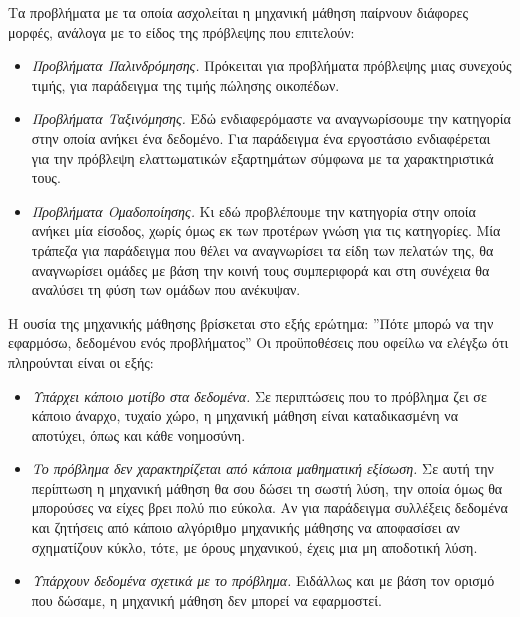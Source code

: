 \documentclass{article}
\begin{document}
Τα προβλήματα με τα οποία ασχολείται η μηχανική μάθηση παίρνουν διάφορες μορφές, ανάλογα με το είδος της πρόβλεψης που επιτελούν:
\begin{itemize}
\item \textit{Προβλήματα Παλινδρόμησης.} Πρόκειται για προβλήματα πρόβλεψης μιας συνεχούς τιμής, για παράδειγμα της τιμής πώλησης οικοπέδων.
\item \textit{Προβλήματα Ταξινόμησης.} Εδώ ενδιαφερόμαστε να αναγνωρίσουμε την κατηγορία στην οποία ανήκει ένα δεδομένο. Για παράδειγμα ένα εργοστάσιο ενδιαφέρεται για την πρόβλεψη ελαττωματικών εξαρτημάτων σύμφωνα με τα χαρακτηριστικά τους.
\item \textit{Προβλήματα Ομαδοποίησης.} Κι εδώ προβλέπουμε την κατηγορία στην οποία ανήκει μία είσοδος, χωρίς όμως εκ των προτέρων γνώση για τις κατηγορίες. Μία τράπεζα για παράδειγμα που θέλει να αναγνωρίσει τα είδη των πελατών της, θα αναγνωρίσει ομάδες με βάση την κοινή τους συμπεριφορά και στη συνέχεια θα αναλύσει τη φύση των ομάδων που ανέκυψαν. 
\end{itemize}
Η ουσία της μηχανικής μάθησης βρίσκεται στο εξής ερώτημα: ''Πότε μπορώ να την εφαρμόσω, δεδομένου ενός προβλήματος'' Οι προϋποθέσεις που οφείλω να ελέγξω ότι πληρούνται είναι οι εξής:
\begin{itemize}
\item \textit{Υπάρχει κάποιο μοτίβο στα δεδομένα.} Σε περιπτώσεις που το πρόβλημα ζει σε κάποιο άναρχο, τυχαίο χώρο, η μηχανική μάθηση είναι καταδικασμένη να αποτύχει, όπως και κάθε νοημοσύνη.
\item \textit{Το πρόβλημα δεν χαρακτηρίζεται από κάποια μαθηματική εξίσωση.} Σε αυτή την περίπτωση η μηχανική μάθηση θα σου δώσει τη σωστή λύση, την οποία όμως θα μπορούσες να είχες βρει πολύ πιο εύκολα. Αν για παράδειγμα συλλέξεις δεδομένα και ζητήσεις από κάποιο αλγόριθμο μηχανικής μάθησης να αποφασίσει αν σχηματίζουν κύκλο, τότε, με όρους μηχανικού, έχεις μια μη αποδοτική λύση. 
\item \textit{Υπάρχουν δεδομένα σχετικά με το πρόβλημα.} Ειδάλλως και με βάση τον ορισμό που δώσαμε, η μηχανική μάθηση δεν μπορεί να εφαρμοστεί.
\end{itemize}
\end{document}
